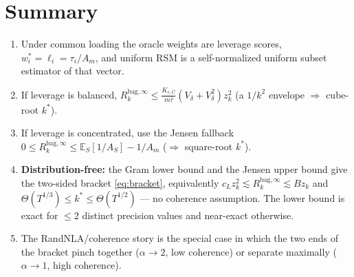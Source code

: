 \documentclass[11pt]{article}
\newcommand{\E}{\mathbb{E}}
\newcommand{\Rk}{R_k^{\mathrm{bag},\infty}}
\begin{document}
\section{Summary}
\begin{enumerate}
\item Under common loading the oracle weights are leverage scores, $w_i^*=\ell_i=\tau_i/A_m$,
and uniform RSM is a self-normalized uniform subset estimator of that vector.
\item If leverage is balanced, $\Rk\le\frac{K_{c,C}}{m\bar\tau}(V_\delta+V_\delta^2)z_k^2$
(a $1/k^2$ envelope $\Rightarrow$ cube-root $k^*$).
\item If leverage is concentrated, use the Jensen fallback
$0\le\Rk\le\E_S[1/A_S]-1/A_m$ ($\Rightarrow$ square-root $k^*$).
\item \textbf{Distribution-free:} the Gram lower bound and the Jensen upper bound give the
two-sided bracket \eqref{eq:bracket}, equivalently $c_Lz_k^2\lesssim\Rk\lesssim Bz_k$ and
$\Theta(T^{1/3})\le k^*\le\Theta(T^{1/2})$ --- no coherence assumption. The lower bound is
exact for $\le2$ distinct precision values and near-exact otherwise.
\item The RandNLA/coherence story is the special case in which the two ends of the bracket
pinch together ($\alpha\to2$, low coherence) or separate maximally ($\alpha\to1$, high
coherence).
\end{enumerate}
\end{document}
